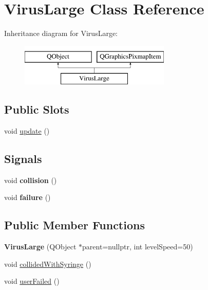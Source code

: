 \hypertarget{classVirusLarge}{\section{Virus\-Large Class Reference}
\label{classVirusLarge}
}
Inheritance diagram for Virus\-Large\-:\begin{figure}[H]
\begin{center}
\leavevmode
\includegraphics[height=2.000000cm]{classVirusLarge}
\end{center}
\end{figure}
\subsection*{Public Slots}
\begin{DoxyCompactItemize}
\item 
void \hyperlink{classVirusLarge_a1867409aa12e3854510355692590e6b8}{update} ()
\end{DoxyCompactItemize}
\subsection*{Signals}
\begin{DoxyCompactItemize}
\item 
\hypertarget{classVirusLarge_aaca3750970743cfbacd43a8a22db4686}{void {\bfseries collision} ()}\label{classVirusLarge_aaca3750970743cfbacd43a8a22db4686}

\item 
\hypertarget{classVirusLarge_a01036cf40eff4e17626f23137934ca6d}{void {\bfseries failure} ()}\label{classVirusLarge_a01036cf40eff4e17626f23137934ca6d}

\end{DoxyCompactItemize}
\subsection*{Public Member Functions}
\begin{DoxyCompactItemize}
\item 
\hypertarget{classVirusLarge_a5948e319e9f2caf7823fee9d2966a793}{{\bfseries Virus\-Large} (Q\-Object $\ast$parent=nullptr, int level\-Speed=50)}\label{classVirusLarge_a5948e319e9f2caf7823fee9d2966a793}

\item 
void \hyperlink{classVirusLarge_a6fc4f92c9da1c5e28c1947614d07e106}{collided\-With\-Syringe} ()
\item 
void \hyperlink{classVirusLarge_a3f782b098d766045c3741b5ba3af412b}{user\-Failed} ()
\end{DoxyCompactItemize}
